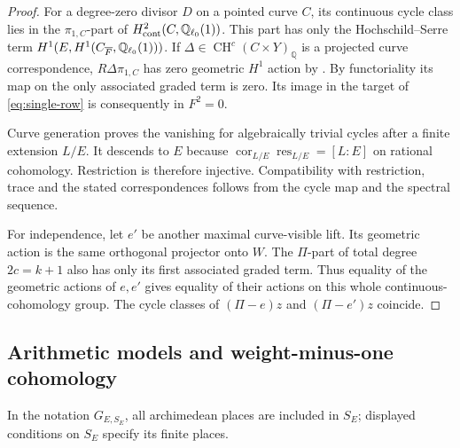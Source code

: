 \documentclass[11pt,a4paper]{article}
\newtheorem{proposition}[theorem]{Proposition}
\theoremstyle{definition}
\DeclareRobustCommand{\MathEqref}[1]{\begingroup\hypersetup{linkcolor=MathEquationLink}\eqref{#1}\endgroup}
\newcommand{\Q}{\mathbb Q}\newcommand{\R}{\mathbb R}\newcommand{\C}{\mathbb C}
\newcommand{\CH}{\operatorname{CH}}\newcommand{\Pic}{\operatorname{Pic}}
\numberwithin{equation}{section}
\begin{document}
\begin{proof}
For a degree-zero divisor \(D\) on a pointed curve \(C\), its
continuous cycle class lies in the \(\pi_{1,C}\)-part of
\(H^2_{\cont}(C,\Q_{\ell_0}(1))\). This part has only the
Hochschild--Serre term
\(H^1(E,H^1(C_{\Fbar},\Q_{\ell_0}(1)))\).
If \(\Delta\in\CH^c(C\times Y)_\Q\) is a projected curve
correspondence, \(R\Delta\pi_{1,C}\) has zero geometric
\(H^1\) action by . By functoriality
its map on the only associated graded term is zero. Its image in
the target of \MathEqref{eq:single-row} is consequently in
\(F^2=0\).

Curve generation proves the vanishing for algebraically trivial
cycles after a finite extension \(L/E\). It descends to \(E\)
because
\(\operatorname{cor}_{L/E}\operatorname{res}_{L/E}=[L:E]\)
on rational cohomology. Restriction is therefore injective.
Compatibility with restriction, trace and the stated
correspondences follows from the cycle map and the spectral
sequence.

For independence, let \(e'\) be another maximal curve-visible
lift. Its geometric action is the same orthogonal projector onto
\(W\). The \(\Pi\)-part of total degree \(2c=k+1\) also has
only its first associated graded term. Thus equality of the
geometric actions of \(e,e'\) gives equality of their actions on
this whole continuous-cohomology group. The cycle classes of
\((\Pi-e)z\) and \((\Pi-e')z\) coincide.
\end{proof}

\subsection{Arithmetic models and weight-minus-one cohomology}
\label{sec:fixed-model}

In the notation \(G_{E,S_E}\), all archimedean places are included
in \(S_E\); displayed conditions on \(S_E\) specify its finite
places.

\end{document}
